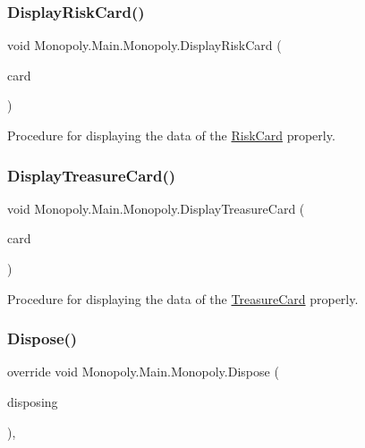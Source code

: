 \subsubsection{\texorpdfstring{Display\+Risk\+Card()}{DisplayRiskCard()}}
{\footnotesize\ttfamily void Monopoly.\+Main.\+Monopoly.\+Display\+Risk\+Card (\begin{DoxyParamCaption}\item[{\mbox{\hyperlink{class_monopoly_1_1_main_1_1_risk_card}{Risk\+Card}}}]{card }\end{DoxyParamCaption})\hspace{0.3cm}{\ttfamily [inline]}}

Procedure for displaying the data of the \mbox{\hyperlink{class_monopoly_1_1_main_1_1_risk_card}{Risk\+Card}} properly. \mbox{\label{class_monopoly_1_1_main_1_1_monopoly_af986f85540fd67a1d3a14391d5a942c7}} 
\subsubsection{\texorpdfstring{Display\+Treasure\+Card()}{DisplayTreasureCard()}}
{\footnotesize\ttfamily void Monopoly.\+Main.\+Monopoly.\+Display\+Treasure\+Card (\begin{DoxyParamCaption}\item[{\mbox{\hyperlink{class_monopoly_1_1_main_1_1_treasure_card}{Treasure\+Card}}}]{card }\end{DoxyParamCaption})\hspace{0.3cm}{\ttfamily [inline]}}

Procedure for displaying the data of the \mbox{\hyperlink{class_monopoly_1_1_main_1_1_treasure_card}{Treasure\+Card}} properly. \mbox{\label{class_monopoly_1_1_main_1_1_monopoly_ad72d470eef7bdabd812725e098e7b77f}} 
\subsubsection{\texorpdfstring{Dispose()}{Dispose()}}
{\footnotesize\ttfamily override void Monopoly.\+Main.\+Monopoly.\+Dispose (\begin{DoxyParamCaption}\item[{bool}]{disposing }\end{DoxyParamCaption})\hspace{0.3cm}{\ttfamily [inline]}, {\ttfamily [protected]}}



